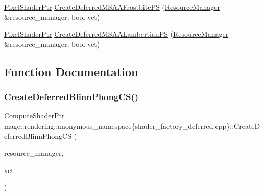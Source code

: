 \begin{DoxyCompactItemize}
\item 
\mbox{\hyperlink{namespacemage_1_1rendering_af03d922b228ee9c8542baaa2ecc9f259}{Pixel\+Shader\+Ptr}} \mbox{\hyperlink{namespacemage_1_1rendering_1_1anonymous__namespace_02shader__factory__deferred_8cpp_03_a3229ac607f682f4501fe1ef504d99769}{Create\+Deferred\+M\+S\+A\+A\+Frostbite\+PS}} (\mbox{\hyperlink{classmage_1_1rendering_1_1_resource_manager}{Resource\+Manager}} \&resource\+\_\+manager, bool vct)
\item 
\mbox{\hyperlink{namespacemage_1_1rendering_af03d922b228ee9c8542baaa2ecc9f259}{Pixel\+Shader\+Ptr}} \mbox{\hyperlink{namespacemage_1_1rendering_1_1anonymous__namespace_02shader__factory__deferred_8cpp_03_adcb84ff23d320fddc5dd4b945f88ab06}{Create\+Deferred\+M\+S\+A\+A\+Lambertian\+PS}} (\mbox{\hyperlink{classmage_1_1rendering_1_1_resource_manager}{Resource\+Manager}} \&resource\+\_\+manager, bool vct)
\end{DoxyCompactItemize}


\subsection{Function Documentation}
\mbox{\label{namespacemage_1_1rendering_1_1anonymous__namespace_02shader__factory__deferred_8cpp_03_ac5adb06d03d8eaedce14d99601702fe7}} 
\subsubsection{\texorpdfstring{Create\+Deferred\+Blinn\+Phong\+C\+S()}{CreateDeferredBlinnPhongCS()}}
{\footnotesize\ttfamily \mbox{\hyperlink{namespacemage_1_1rendering_ab3dc9f2114f2e9255b91d9c051da52ea}{Compute\+Shader\+Ptr}} mage\+::rendering\+::anonymous\+\_\+namespace\{shader\+\_\+factory\+\_\+deferred.\+cpp\}\+::Create\+Deferred\+Blinn\+Phong\+CS (\begin{DoxyParamCaption}\item[{\mbox{\hyperlink{classmage_1_1rendering_1_1_resource_manager}{Resource\+Manager}} \&}]{resource\+\_\+manager,  }\item[{bool}]{vct }\end{DoxyParamCaption})}

